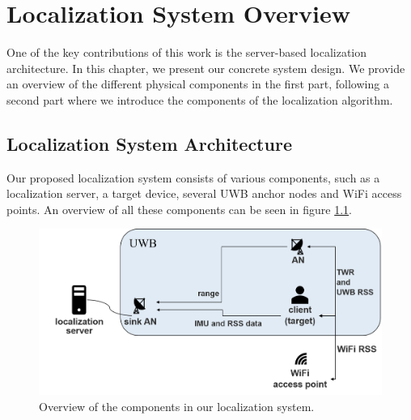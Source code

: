 
\chapter{Localization System Overview} %

\label{Chapter4} %
One of the key contributions of this work is the server-based localization architecture. In this chapter, we present our concrete system design. We provide an overview of the different physical components in the first part, following a second part where we introduce the components of the localization algorithm. 


\section{Localization System Architecture}
Our proposed localization system consists of various components, such as a localization server, a target device, several UWB anchor nodes and WiFi access points. An overview of all these components can be seen in figure \ref{fig:system_components}.\\
\begin{figure}[th]
\centering
\includegraphics[width=1.0\textwidth]{Figures/system_components}
\decoRule
\caption[System Architecture]{Overview of the components in our localization system.}
\label{fig:system_components}
\end{figure}

